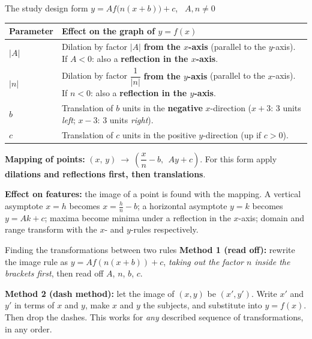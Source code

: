 \begin{keyres}{The study design form $y=Af\big(n(x+b)\big)+c$, \ $A,n\ne0$}
\begin{center}
\begin{tabularx}{\linewidth}{@{}lL@{}}
\toprule
Parameter & Effect on the graph of $y=f(x)$ \\
\midrule
$|A|$ & Dilation by factor $|A|$ \textbf{from the $x$-axis} (parallel to the $y$-axis). If $A<0$: also a \textbf{reflection in the $x$-axis}. \\
$|n|$ & Dilation by factor $\dfrac{1}{|n|}$ \textbf{from the $y$-axis} (parallel to the $x$-axis). If $n<0$: also a \textbf{reflection in the $y$-axis}. \\
$b$ & Translation of $b$ units in the \textbf{negative} $x$-direction ($x+3$: 3 units \emph{left}; $x-3$: 3 units \emph{right}). \\
$c$ & Translation of $c$ units in the positive $y$-direction (up if $c>0$). \\
\bottomrule
\end{tabularx}
\end{center}
\textbf{Mapping of points:} \quad $(x,\,y)\ \longrightarrow\ \left(\dfrac{x}{n}-b,\ \ Ay+c\right)$. \quad For this form apply \textbf{dilations and reflections first, then translations}.\par
\textbf{Effect on features:} the image of a point is found with the mapping. A vertical asymptote $x=h$ becomes $x=\frac{h}{n}-b$; a horizontal asymptote $y=k$ becomes $y=Ak+c$; maxima become minima under a reflection in the $x$-axis; domain and range transform with the $x$- and $y$-rules respectively.
\end{keyres}

\begin{method}{Finding the transformations between two rules}
\textbf{Method 1 (read off):} rewrite the image rule as $y=Af(n(x+b))+c$, \emph{taking out the factor $n$ inside the brackets first}, then read off $A$, $n$, $b$, $c$.\par
\textbf{Method 2 (dash method):} let the image of $(x,y)$ be $(x',y')$. Write $x'$ and $y'$ in terms of $x$ and $y$, make $x$ and $y$ the subjects, and substitute into $y=f(x)$. Then drop the dashes. This works for \emph{any} described sequence of transformations, in any order.
\end{method}

